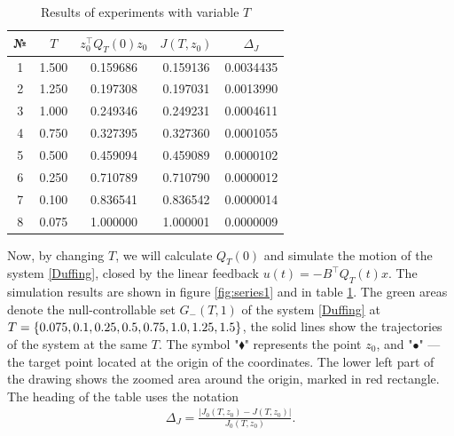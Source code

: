 \documentclass[../main.tex]{subfiles}
\begin{document}
\begin{table}
\caption{Results of experiments with variable $T$}
\label{ExampleTable1}
\begin{center}
\begin{tabular}{c|c|c|c|c}
    № & $T$   &  $z_0^{\top} Q_T(0) z_0$   & $ J(T,z_0) $  & $ 
    \Delta_J $   \\ \hline 
    1 & 1.500 & 0.159686  & 0.159136 & 0.0034435   \\ \hline
     2 & 1.250 & 0.197308  & 0.197031 & 0.0013990   \\ \hline
     3 & 1.000 & 0.249346  & 0.249231 & 0.0004611  \\ \hline
     4 & 0.750 & 0.327395  & 0.327360 & 0.0001055   \\ \hline
     5 & 0.500 & 0.459094 & 0.459089 & 0.0000102   \\ \hline
     6 & 0.250 & 0.710789  & 0.710790 & 0.0000012   \\ \hline
     7 & 0.100 & 0.836541  & 0.836542 & 0.0000014   \\ \hline
     8 & 0.075 & 1.000000  & 1.000001 & 0.0000009   \\ \hline
\end{tabular}
\end{center}
\end{table}

Now, by changing $T$, we will calculate $Q_T(0)$ and simulate the motion of the system \eqref{Duffing}, closed by the linear feedback $u(t) = -B^{\top}Q_T(t)x$.
The simulation results are shown in figure \ref{fig:series1} and in table 
\ref{ExampleTable1}. The green areas denote the null-controllable set 
$G_{-}(T,1)$ of the system \eqref{Duffing} at $T = \{0.075, 0.1, 0.25, 0.5, 0.75, 1.0,\\ 1.25, 1.5\}$, the solid lines show the trajectories of the system at the same $T$. 
The symbol "$\blacklozenge$" represents the point $z_0$, and "$\bullet$" --- 
the target point located at the origin of the coordinates. The lower left part of the drawing shows 
the zoomed area around the origin, marked in red 
rectangle. The heading of the table uses the notation 
\begin{gather*}
    \Delta_J = \frac{| J_0(T,z_0) - J(T,z_0) |}{J_0(T,z_0)}.
\end{gather*}
\end{document}
